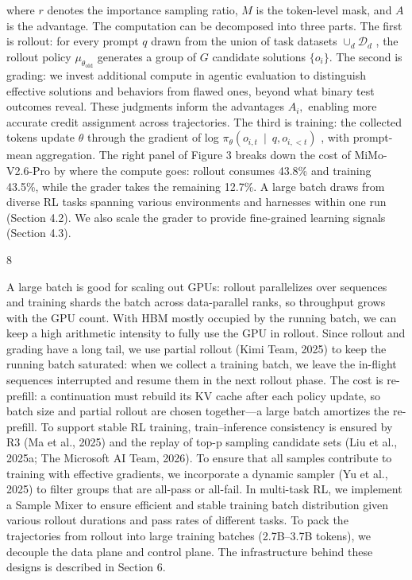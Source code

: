 \documentclass[
  10
]{article}
\begin{document}
where $r$ denotes the importance sampling ratio, $M$ is the token-level
mask, and $A$ is the advantage. The computation can be decomposed into
three parts. The first is rollout: for every prompt $q$ drawn from the
union of task datasets \(\cup _ { d } \mathcal { D } _ { d }\) , the
rollout policy \(\mu _ { \theta _ { \mathrm { o l d } } }\) generates a
group of $G$ candidate solutions $\{o_i\}$. The second is grading: we invest
additional compute in agentic evaluation to distinguish effective
solutions and behaviors from flawed ones, beyond what binary test
outcomes reveal. These judgments inform the advantages \(A _ { i } ,\)
enabling more accurate credit assignment across trajectories. The third
is training: the collected tokens update $\theta$ through the gradient of log
\(\pi _ { \theta } ( o _ { i , t } ~ \mid ~ q , o _ { i , < t } )\) ,
with prompt-mean aggregation. The right panel of Figure 3 breaks down
the cost of MiMo-V2.6-Pro by where the compute goes: rollout consumes
43.8\% and training 43.5\%, while the grader takes the remaining 12.7\%.
A large batch draws from diverse RL tasks spanning various environments
and harnesses within one run (Section 4.2). We also scale the grader to
provide fine-grained learning signals (Section 4.3).

8

A large batch is good for scaling out GPUs: rollout parallelizes over
sequences and training shards the batch across data-parallel ranks, so
throughput grows with the GPU count. With HBM mostly occupied by the
running batch, we can keep a high arithmetic intensity to fully use the
GPU in rollout. Since rollout and grading have a long tail, we use
partial rollout (Kimi Team, 2025) to keep the running batch saturated:
when we collect a training batch, we leave the in-flight sequences
interrupted and resume them in the next rollout phase. The cost is
re-prefill: a continuation must rebuild its KV cache after each policy
update, so batch size and partial rollout are chosen together---a large
batch amortizes the re-prefill. To support stable RL training,
train--inference consistency is ensured by R3 (Ma et al., 2025) and the
replay of top-p sampling candidate sets (Liu et al., 2025a; The
Microsoft AI Team, 2026). To ensure that all samples contribute to
training with effective gradients, we incorporate a dynamic sampler (Yu
et al., 2025) to filter groups that are all-pass or all-fail. In
multi-task RL, we implement a Sample Mixer to ensure efficient and stable
training batch distribution given various rollout durations and pass
rates of different tasks. To pack the trajectories from rollout into
large training batches (2.7B--3.7B tokens), we decouple the data plane
and control plane. The infrastructure behind these designs is described
in Section 6.
\end{document}
